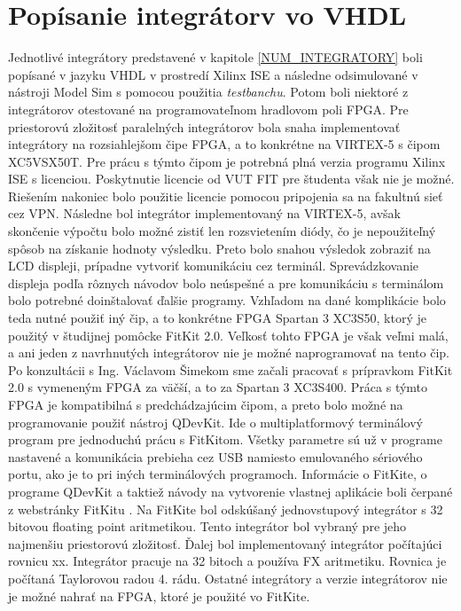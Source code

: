 \chapter{Popísanie integrátorv vo VHDL}
Jednotlivé integrátory predstavené v kapitole \ref{NUM_INTEGRATORY} boli popísané v jazyku VHDL v prostredí Xilinx ISE a následne odsimulované v nástroji Model Sim s pomocou použitia \textit{testbanchu}. Potom boli niektoré z integrátorov otestované na programovateľnom hradlovom poli FPGA.
Pre priestorovú zložitosť paralelných integrátorov bola snaha implementovať integrátory na rozsiahlejšom čipe FPGA, a to konkrétne na VIRTEX-5 s čipom XC5VSX50T. Pre prácu s týmto čipom je potrebná plná verzia programu Xilinx ISE s licenciou. Poskytnutie licencie od VUT FIT pre študenta však nie je možné. Riešením nakoniec bolo použitie licencie pomocou pripojenia sa na fakultnú sieť cez VPN. Následne bol integrátor implementovaný na VIRTEX-5, avšak skončenie výpočtu bolo možné zistiť len rozsvietením diódy, čo je nepoužiteľný spôsob na získanie hodnoty výsledku. Preto bolo snahou výsledok zobraziť na LCD displeji, prípadne vytvoriť komunikáciu cez terminál. Sprevádzkovanie displeja podľa rôznych návodov bolo neúspešné a pre komunikáciu s terminálom bolo potrebné doinštalovať ďalšie programy. Vzhľadom na dané komplikácie bolo teda nutné použiť iný čip, a to konkrétne FPGA Spartan 3 XC3S50, ktorý je použitý v študijnej pomôcke FitKit 2.0. Veľkosť tohto FPGA je však veľmi malá, a ani jeden z navrhnutých integrátorov nie je možné naprogramovať na tento čip. Po konzultácii s Ing. Václavom Šimekom sme začali pracovať s prípravkom FitKit 2.0 s vymeneným FPGA za väčší, a to za Spartan 3 XC3S400. Práca s týmto FPGA je kompatibilná s predchádzajúcim čipom, a preto bolo možné na programovanie použiť nástroj QDevKit. Ide o multiplatformový terminálový program pre jednoduchú prácu s FitKitom. Všetky parametre sú už v programe nastavené a komunikácia prebieha cez USB namiesto emulovaného sériového portu, ako je to pri iných terminálových programoch. Informácie o FitKite, o programe QDevKit a taktiež návody na vytvorenie vlastnej aplikácie boli čerpané z webstránky FitKitu \cite{fitkit}.
Na FitKite bol odskúšaný jednovstupový integrátor s 32 bitovou floating point aritmetikou. Tento integrátor bol vybraný pre jeho najmenšiu priestorovú zložitosť. Ďalej bol implementovaný integrátor počítajúci rovnicu xx. Integrátor pracuje na 32 bitoch a používa FX aritmetiku. Rovnica je počítaná Taylorovou radou 4. rádu. Ostatné integrátory a verzie integrátorov nie je možné nahrať na FPGA, ktoré je použité vo FitKite.

